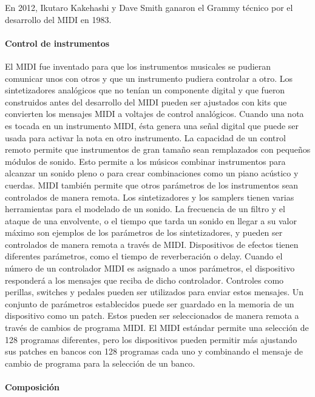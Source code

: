 \documentclass[a4paper,11pt,oneside]{book}
\begin{document}
En 2012, Ikutaro Kakehashi y Dave Smith ganaron el Grammy técnico por el desarrollo del MIDI en 1983.

\paragraph{Control de instrumentos}

El MIDI fue inventado para que los instrumentos musicales se pudieran comunicar unos con otros y que un instrumento pudiera controlar a otro. Los sintetizadores analógicos que no tenían un componente digital y que fueron construidos antes del desarrollo del MIDI pueden ser ajustados con kits que convierten los mensajes MIDI a voltajes de control analógicos. Cuando una nota es tocada en un instrumento MIDI, ésta genera una señal digital que puede ser usada para activar la nota en otro instrumento. La capacidad de un control remoto permite que instrumentos de gran tamaño sean remplazados con pequeños módulos de sonido. Esto permite a los músicos combinar instrumentos para alcanzar un sonido pleno o para crear combinaciones como un piano acústico y cuerdas. MIDI también permite que otros parámetros de los instrumentos sean controlados de manera remota. Los sintetizadores y los samplers tienen varias herramientas para el modelado de un sonido. La frecuencia de un filtro y el ataque de una envolvente, o el tiempo que tarda un sonido en llegar a su valor máximo son ejemplos de los parámetros de los sintetizadores, y pueden ser controlados de manera remota a través de MIDI. Dispositivos de efectos tienen diferentes parámetros, como el tiempo de reverberación o delay. Cuando el número de un controlador MIDI es asignado a unos parámetros, el dispositivo responderá a los mensajes que reciba de dicho controlador. Controles como perillas, switches y pedales pueden ser utilizados para enviar estos mensajes. Un conjunto de parámetros establecidos puede ser guardado en la memoria de un dispositivo como un patch. Estos pueden ser seleccionados de manera remota a través de cambios de programa MIDI. El MIDI estándar permite una selección de 128 programas diferentes, pero los dispositivos pueden permitir más ajustando sus patches en bancos con 128 programas cada uno y combinando el mensaje de cambio de programa para la selección de un banco.

\paragraph{Composición}
\end{document}
